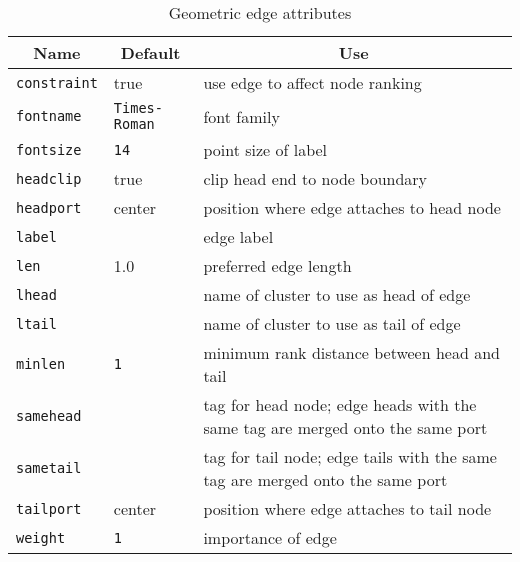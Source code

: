 \begin{table}[htbp]\footnotesize
\centering
\begin{tabular}[t]{|l|l|p{2.5in}|} \hline
\multicolumn{1}{|c|}{Name} & \multicolumn{1}{c|}{Default} & \multicolumn{1}{c|}{Use} \\ \hline
{\tt constraint} & true & use edge to affect node ranking \\
{\tt fontname} & {\tt Times-Roman} & font family \\
{\tt fontsize} & {\tt 14} & point size of label \\
{\tt headclip} & true & clip head end to node boundary \\
{\tt headport} & center & position where edge attaches to head node \\
{\tt label} & & edge label \\
{\tt len} & 1.0 & preferred edge length \\
{\tt lhead} & & name of cluster to use as head of edge \\
{\tt ltail} & & name of cluster to use as tail of edge \\
{\tt minlen} & {\tt 1} & minimum rank distance between head and tail \\
{\tt samehead} & & tag for head node; edge heads with the same tag are merged
 onto the same port \\
{\tt sametail} & & tag for tail node; edge tails with the same tag are merged
 onto the same port \\
{\tt tailport} & center & position where edge attaches to tail node \\
{\tt weight} & {\tt 1} & importance of edge \\
\hline
\end{tabular}
\caption{Geometric edge attributes}
\label{tab:eattr_geom}
\end{table}
